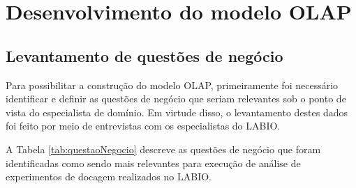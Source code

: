\renewcommand{\algorithmicfor}{\textbf{para}}
\renewcommand{\algorithmicif}{\textbf{se}}
\renewcommand{\algorithmicthen}{\textbf{então}}
\renewcommand{\algorithmicelse}{\textbf{senão}}
\renewcommand{\algorithmicendif}{\textbf{fim se}}
\renewcommand{\algorithmicendfor}{\textbf{fim para}}
\renewcommand{\algorithmicdo}{\textbf{faça}}

\chapter{Desenvolvimento do modelo OLAP}
\label{cap:DesenvolvimentoDoModeloOLAP}
\section{Levantamento de questões de negócio}
\label{sec:LevantamentoDeQuestoesDeNegocio}

Para possibilitar a construção do modelo OLAP, primeiramente foi necessário identificar e definir as questões de negócio que seriam relevantes sob o ponto de vista do especialista de domínio. Em virtude disso, o levantamento destes dados foi feito por meio de entrevistas com os especialistas do LABIO.

A Tabela \ref{tab:questaoNegocio} descreve as questões de negócio que foram identificadas como sendo mais relevantes para execução de análise de experimentos de docagem realizados no LABIO. 

